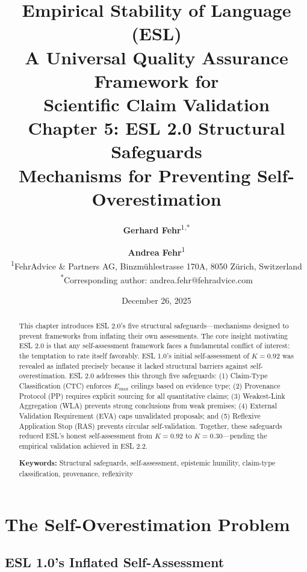 \documentclass[11pt,a4paper]{article}
\title{%
    \Large \textbf{Empirical Stability of Language (ESL)} \\[0.5em]
    \large A Universal Quality Assurance Framework for \\
    Scientific Claim Validation \\[1em]
    \LARGE \textbf{Chapter 5: ESL 2.0 Structural Safeguards} \\[0.3em]
    \large Mechanisms for Preventing Self-Overestimation
}
\author{%
    \textbf{Gerhard Fehr}\textsuperscript{1,*} \and \textbf{Andrea Fehr}\textsuperscript{1} \\[0.5em]
    \textsuperscript{1}FehrAdvice \& Partners AG, Binzmühlestrasse 170A, 8050 Zürich, Switzerland \\[0.3em]
    \textsuperscript{*}Corresponding author: andrea.fehr@fehradvice.com
}
\date{December 26, 2025}
\theoremstyle{remark}
\begin{document}
\maketitle


\begin{abstract}
\noindent
This chapter introduces ESL 2.0's five structural safeguards---mechanisms designed to prevent frameworks from inflating their own assessments. The core insight motivating ESL 2.0 is that any self-assessment framework faces a fundamental conflict of interest: the temptation to rate itself favorably. ESL 1.0's initial self-assessment of $K = 0.92$ was revealed as inflated precisely because it lacked structural barriers against self-overestimation. ESL 2.0 addresses this through five safeguards: (1) Claim-Type Classification (CTC) enforces $E_{\max}$ ceilings based on evidence type; (2) Provenance Protocol (PP) requires explicit sourcing for all quantitative claims; (3) Weakest-Link Aggregation (WLA) prevents strong conclusions from weak premises; (4) External Validation Requirement (EVA) caps unvalidated proposals; and (5) Reflexive Application Stop (RAS) prevents circular self-validation. Together, these safeguards reduced ESL's honest self-assessment from $K = 0.92$ to $K = 0.30$---pending the empirical validation achieved in ESL 2.2.

\vspace{0.5em}
\noindent\textbf{Keywords:} Structural safeguards, self-assessment, epistemic humility, claim-type classification, provenance, reflexivity
\end{abstract}

\tableofcontents
\newpage


\section{The Self-Overestimation Problem}
\label{sec:problem}

\subsection{ESL 1.0's Inflated Self-Assessment}
\end{document}
